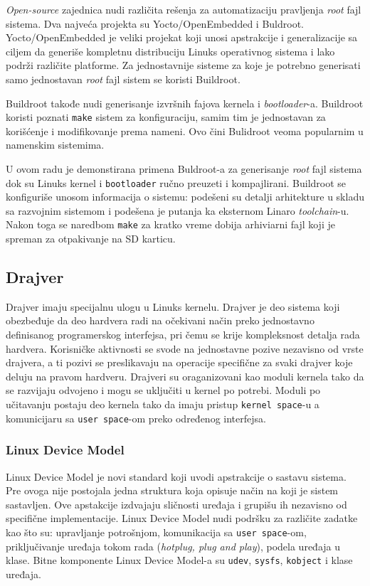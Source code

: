 \textit{Open-source} zajednica nudi različita rešenja za automatizaciju pravljenja \textit{root} fajl sistema. Dva najveća projekta su Yocto/OpenEmbedded i Buldroot. Yocto/OpenEmbedded je veliki projekat koji unosi apstrakcije i generalizacije sa ciljem da generiše kompletnu distribuciju Linuks operativnog sistema i lako podrži različite platforme. Za jednostavnije sisteme za koje je potrebno generisati samo jednostavan \textit{root} fajl sistem se koristi Buildroot.

Buildroot takođe nudi generisanje izvršnih fajova kernela i \textit{bootloader}-a. Buildroot koristi poznati \texttt{make} sistem za konfiguraciju, samim tim je jednostavan za korišćenje i modifikovanje prema nameni. Ovo čini Bulidroot veoma popularnim u namenskim sistemima.

U ovom radu je demonstirana primena Buldroot-a za generisanje \textit{root} fajl sistema dok su Linuks kernel i \texttt{bootloader} ručno preuzeti i kompajlirani. Buildroot se konfiguriše unosom informacija o sistemu: podešeni su detalji arhitekture u skladu sa razvojnim sistemom i podešena je putanja ka eksternom Linaro \textit{toolchain}-u. Nakon toga se naredbom \texttt{make} za kratko vreme dobija arhiviarni fajl koji je spreman za otpakivanje na SD karticu.

\subsection{Drajver}
Drajver imaju specijalnu ulogu u Linuks kernelu. Drajver je deo sistema koji obezbeđuje da deo hardvera radi na očekivani način preko jednostavno definisanog programerskog interfejsa, pri čemu se krije kompleksnost detalja rada hardvera. Korisničke aktivnosti se svode na jednostavne pozive nezavisno od vrste drajvera, a ti pozivi se preslikavaju na operacije specifične za svaki drajver koje deluju na pravom hardveru. Drajveri su oraganizovani kao moduli kernela tako da se razvijaju odvojeno i mogu se uključiti u kernel po potrebi. Moduli po učitavanju postaju deo kernela tako da imaju pristup \texttt{kernel space}-u a komunicijaru sa \texttt{user space}-om preko određenog interfejsa.

\subsubsection{Linux Device Model}
Linux Device Model je novi standard koji uvodi apstrakcije o sastavu sistema. Pre ovoga nije postojala jedna struktura koja opisuje način na koji je sistem sastavljen. Ove apstakcije izdvajaju sličnosti uređaja i grupišu ih nezavisno od specifične implementacije. Linux Device Model nudi podršku za različite zadatke kao što su: upravljanje potrošnjom, komunikacija sa \texttt{user space}-om, priključivanje uređaja tokom rada (\textit{hotplug, plug and play}), podela uređaja u klase. Bitne komponente Linux Device Model-a su \texttt{udev}, \texttt{sysfs}, \texttt{kobject} i klase uređaja.


